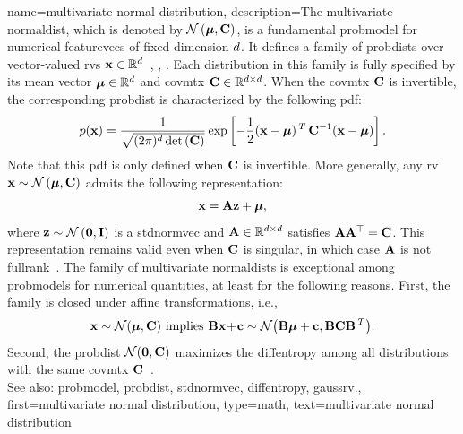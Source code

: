 {name={multivariate normal distribution}, 
	description={The multivariate \gls{normaldist}, 
		which is denoted by $\mathcal{N}\left({\bm \mu},{\bf C}\right)$, is a fundamental 
		\gls{probmodel} for numerical \glspl{featurevec} of fixed dimension $d$. 
		It defines a family of \glspl{probdist} over \gls{vector}-valued \glspl{rv} 
		${\bf x} \in \mathbb{R}^{d}$~\cite{BertsekasProb}, \cite{GrayProbBook}, \cite{Lapidoth09}. 
		Each distribution in this family is fully specified by its \gls{mean} \gls{vector} 
		${\bm \mu} \in \mathbb{R}^{d}$ and \gls{covmtx} 
		${\bf C} \in \mathbb{R}^{d \times d}$. When the 
		\gls{covmtx} ${\bf C}$ is \gls{invertible}, the corresponding \gls{probdist} is 
		characterized by the following \gls{pdf}:
		\[p({\bf x}) = 
 		\frac{1}{\sqrt{(2\pi)^{d} \det\,({\bf C})}} 
 		\exp\left[ -\frac{1}{2} 
 		({\bf x} - {\bm \mu})\,^{T}\, {\bf C}^{-1} 
 		({\bf x} - {\bm \mu}) \right].
 		\]
		Note that this \gls{pdf} is only defined when ${\bf C}$ is \gls{invertible}.
   		More generally, any \gls{rv} ${\bf x} \sim \mathcal{N}\left({\bm \mu},{\bf C}\right)$ 
   		admits the following representation:
  		\[
    		{\bf x} = {\bf A} {\bf z} + {\bm \mu},
   		\]
   		where ${\bf z} \sim \mathcal{N}\left(\mathbf{0},\mathbf{I}\right)$ is a \gls{stdnormvec} 
   		and ${\bf A} \in \mathbb{R}^{d \times d}$ satisfies ${\bf A} {\bf A}^\top = {\bf C}$. 
   		This representation remains valid even when ${\bf C}$ is singular, in which case ${\bf A}$ 
   		is not \gls{fullrank}~\cite[Ch. 23]{Lapidoth2017}.
   		The family of multivariate \glspl{normaldist} is exceptional among \glspl{probmodel} for numerical 
   		quantities, at least for the following reasons. First, the family is closed under affine 
   		transformations, i.e.,
		\[ 
		{\bf x} \sim \mathcal{N}({\bm \mu},{\bf C}) \mbox{ implies } 
		{\bf B}{\bf x}\!+\!{\bf c} \sim \mathcal{N}\big( {\bf B}{\bm \mu}+{\bf c},{\bf B} {\bf C} {\bf B}\,^{T} \big). 
		\]
		Second, the \gls{probdist} $\mathcal{N}(\mathbf{0},{\bf C})$ maximizes the 
		\gls{diffentropy} among all distributions with the same \gls{covmtx} ${\bf C}$~\cite{coverthomas}. 
		\\ 
		See also: \gls{probmodel}, \gls{probdist}, \gls{stdnormvec}, \gls{diffentropy}, \gls{gaussrv}.}, 
	first={multivariate normal distribution},
	type=math, 
	text={multivariate normal distribution}
}

